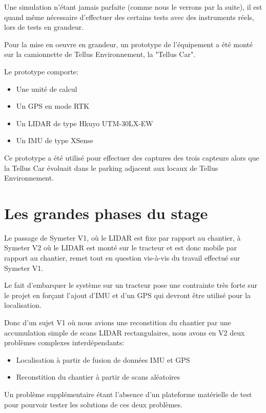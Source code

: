 \documentclass[12pt,a4paper]{report}
\begin{document}
			Une simulation n'étant jamais parfaite (comme nous le verrons par la suite), il est quand même nécessaire d'effectuer des certains tests avec des instruments réels, lors de tests en grandeur.
		
			\para Pour la mise en oeuvre en grandeur, un prototype de l'équipement a été monté sur la camionnette de Tellus Environnement, la "Tellus Car".
			
			\para Le prototype comporte:
			\begin{itemize}
				\item Une unité de calcul
				\item Un GPS en mode RTK
				\item Un LIDAR de type Hkuyo UTM-30LX-EW
				\item Un IMU de type XSense
			\end{itemize}
		
			\para Ce prototype a été utilisé pour effectuer des captures des trois capteurs alors que la Tellus Car évoluait dans le parking adjacent aux locaux de Tellus Environnement.
		
	\section{Les grandes phases du stage}
	
	Le passage de Symeter V1, où le LIDAR est fixe par rapport au chantier, à Symeter V2 où le LIDAR est monté sur le tracteur et est donc mobile par rapport au chantier, remet tout en question vis-à-vis du travail effectué sur Symeter V1.
	
	\para Le fait d'embarquer le système sur un tracteur pose une contrainte très forte sur le projet en forçant l'ajout d'IMU et d'un GPS qui devront être utilisé pour la localisation.
	
	\para Donc d'un sujet V1 où nous avions une reconstition du chantier par une accumulation simple de scans LIDAR rectangulaires, nous avons en V2 deux  problèmes complexes interdépendants:
	\begin{itemize}
		\item Localisation à partir de fusion de données IMU et GPS
		\item Reconstition du chantier à partir de scans aléatoires
	\end{itemize}

	\para Un problème supplémentaire étant l'absence d'un plateforme matérielle de test pour pourvoir tester les solutions de ces deux problèmes.
	
\end{document}
